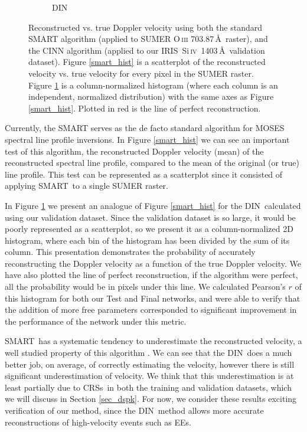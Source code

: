 \documentclass[10pt,letterpaper]{article}
\newcommand{\SiIV}{Si\,\textsc{iv}~1403\,\AA}
\newcommand{\OIII}{O\,\textsc{iii} 703.87\,\AA}
\newcommand{\EEs}{\acp{EE}}
\newcommand{\SMART}{\ac{SMART}}
\newcommand{\DIN}{\ac{DIN}}
\newcommand{\IRIS}{\ac{IRIS}}
\newcommand{\CRSs}{\acp{CRS}}
\begin{document}
\begin{figure}[t!]
\begin{subfigure}[t]{0.45\textwidth}
					\caption{DIN}
					\label{din_hist}
				\end{subfigure}
				\caption{Reconstructed vs. true Doppler velocity using both the standard SMART algorithm (applied to SUMER \OIII\ raster), and the CINN algorithm (applied to our \IRIS\ \SiIV\ validation dataset). Figure \ref{smart_hist} is a scatterplot of the reconstructed velocity vs. true velocity for every pixel in the SUMER raster. Figure \ref{din_hist} is a column-normalized histogram (where each column is an independent, normalized distribution) with the same axes as Figure \ref{smart_hist}. Plotted in red is the line of perfect reconstruction.}
				\label{dopp_hist}
			\end{figure}

			Currently, the \SMART\citep{fox1} serves as the de facto standard algorithm for MOSES spectral line profile inversions.
			In Figure \ref{smart_hist} we can see an important test of this algorithm, the reconstructed Doppler velocity (mean) of the reconstructed spectral line profile, compared to the mean of the original (or true) line profile.
			This test can be represented as a scatterplot since it consisted of applying \SMART\ to a single SUMER raster.
			
			In Figure \ref{din_hist} we present an analogue of Figure \ref{smart_hist} for the \DIN\ calculated using our validation dataset.
			Since the validation dataset is so large, it would be poorly represented as a scatterplot, so we present it as a column-normalized 2D histogram, where each bin of the histogram has been divided by the sum of its column.
			This presentation demonstrates the probability of accurately reconstructing the Doppler velocity as a function of the true Doppler velocity.
			We have also plotted the line of perfect reconstruction, if the algorithm were perfect, all the probability would be in pixels under this line.
			We calculated Pearson's $r$ of this histogram for both our Test and Final networks, and were able to verify that the addition of more free parameters corresponded to significant improvement in the performance of the network under this metric.
			
			\SMART\ has a systematic tendency to underestimate the reconstructed velocity, a well studied property of this algorithm \citep{Fox2011,Rust2017}.
			We can see that the \DIN\ does a much better job, on average, of correctly estimating the velocity, however there is still significant underestimation of velocity.
			We think that this underestimation is at least partially due to \CRSs\ in both the training and validation datasets, which we will discuss in Section \ref{sec_dspk}.
			For now, we consider these results exciting verification of our method, since the \DIN\ method allows more accurate reconstructions of high-velocity events such as \EEs.		
						
\end{document}
